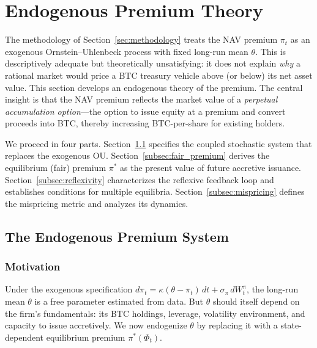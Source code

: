
\section{Endogenous Premium Theory}\label{sec:endogenous_premium}

The methodology of Section~\ref{sec:methodology} treats the NAV premium
$\pi_t$ as an exogenous Ornstein--Uhlenbeck process with fixed long-run mean
$\theta$.  This is descriptively adequate but theoretically unsatisfying: it
does not explain \emph{why} a rational market would price a BTC treasury
vehicle above (or below) its net asset value.  This section develops an
endogenous theory of the premium.  The central insight is that the NAV premium
reflects the market value of a \emph{perpetual accumulation option}---the
option to issue equity at a premium and convert proceeds into BTC, thereby
increasing BTC-per-share for existing holders.

We proceed in four parts.  Section~\ref{subsec:endo_system} specifies the
coupled stochastic system that replaces the exogenous OU.
Section~\ref{subsec:fair_premium} derives the equilibrium (fair) premium
$\pi^*$ as the present value of future accretive issuance.
Section~\ref{subsec:reflexivity} characterizes the reflexive feedback loop and
establishes conditions for multiple equilibria.
Section~\ref{subsec:mispricing} defines the mispricing metric and analyzes its
dynamics.

\subsection{The Endogenous Premium System}\label{subsec:endo_system}

\subsubsection{Motivation}

Under the exogenous specification $d\pi_t = \kappa(\theta - \pi_t)\,dt +
\sigma_\pi\,dW_t^\pi$, the long-run mean $\theta$ is a free parameter
estimated from data.  But $\theta$ should itself depend on the firm's
fundamentals: its BTC holdings, leverage, volatility environment, and
capacity to issue accretively.  We now endogenize $\theta$ by replacing it
with a state-dependent equilibrium premium $\pi^*(\Phi_t)$.

